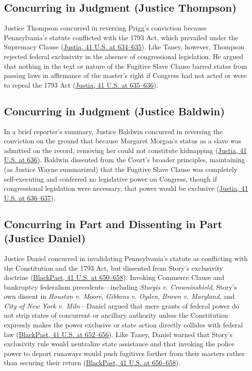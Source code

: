 \documentclass[12pt]{article}
\begin{document}
\subsection{Concurring in Judgment (Justice Thompson)}
Justice Thompson concurred in reversing Prigg's conviction because Pennsylvania's statute conflicted with the 1793 Act, which prevailed under the Supremacy Clause (\href{https://supreme.justia.com/cases/federal/us/41/539/}{Justia, 41 U.S. at 634--635}). Like Taney, however, Thompson rejected federal exclusivity in the absence of congressional legislation. He argued that nothing in the text or nature of the Fugitive Slave Clause barred states from passing laws in affirmance of the master's right if Congress had not acted or were to repeal the 1793 Act (\href{https://supreme.justia.com/cases/federal/us/41/539/}{Justia, 41 U.S. at 635--636}).

\subsection{Concurring in Judgment (Justice Baldwin)}
In a brief reporter's summary, Justice Baldwin concurred in reversing the conviction on the ground that because Margaret Morgan's status as a slave was admitted on the record, removing her could not constitute kidnapping (\href{https://supreme.justia.com/cases/federal/us/41/539/}{Justia, 41 U.S. at 636}). Baldwin dissented from the Court's broader principles, maintaining (as Justice Wayne summarized) that the Fugitive Slave Clause was completely self-executing and conferred no legislative power on Congress, though if congressional legislation were necessary, that power would be exclusive (\href{https://supreme.justia.com/cases/federal/us/41/539/}{Justia, 41 U.S. at 636--637}).

\subsection{Concurring in Part and Dissenting in Part (Justice Daniel)}
Justice Daniel concurred in invalidating Pennsylvania's statute as conflicting with the Constitution and the 1793 Act, but dissented from Story's exclusivity doctrine (\href{https://blackpast.org/african-american-history/prigg-v-pennsylvania-1842/}{BlackPast, 41 U.S. at 650--658}). Invoking Commerce Clause and bankruptcy federalism precedents---including \textit{Sturgis v. Crowninshield}, Story's own dissent in \textit{Houston v. Moore}, \textit{Gibbons v. Ogden}, \textit{Brown v. Maryland}, and \textit{City of New York v. Miln}---Daniel argued that mere grants of federal power do not strip states of concurrent or ancillary authority unless the Constitution expressly makes the power exclusive or state action directly collides with federal law (\href{https://blackpast.org/african-american-history/prigg-v-pennsylvania-1842/}{BlackPast, 41 U.S. at 652--656}). Like Taney, Daniel warned that Story's exclusivity rule would neutralize state assistance and that invoking the police power to deport runaways would push fugitives farther from their masters rather than securing their return (\href{https://blackpast.org/african-american-history/prigg-v-pennsylvania-1842/}{BlackPast, 41 U.S. at 656--658}).
\end{document}
